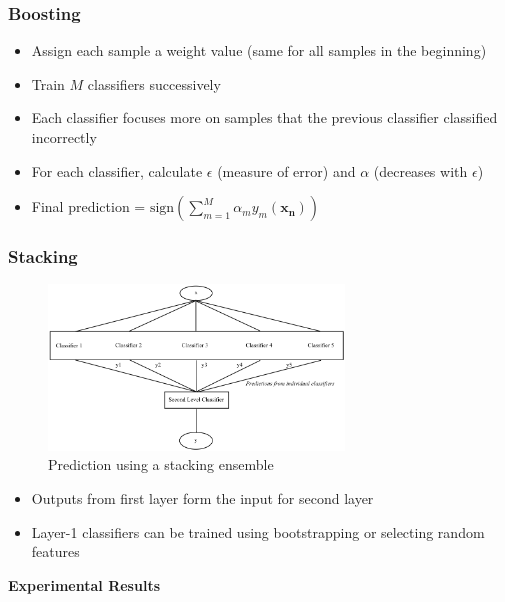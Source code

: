 \documentclass[9pt]{beamer}
\begin{document}
    \begin{frame}
        \frametitle{Boosting}
        \begin{itemize}
            \item{Assign each sample a weight value (same for all samples in the beginning)}
            \item{Train $M$ classifiers successively}
            \item{Each classifier focuses more on samples that the previous classifier classified incorrectly}
            \item{For each classifier, calculate $\epsilon$ (measure of error) and $\alpha$ (decreases with $\epsilon$)}
            \item{Final prediction = $\mathrm{sign}(\displaystyle \sum_{m = 1}^{M} \alpha_m y_m(\mathbf{x_n}))$}
        \end{itemize}
    \end{frame}
    
    \begin{frame}
        \frametitle{Stacking}
        \begin{figure}
            \centering
            \includegraphics[width=0.7\textwidth]{figures/stacking_prediction_flow.png}
            \caption{Prediction using a stacking ensemble}
        \end{figure}
        \begin{itemize}
            \item{Outputs from first layer form the input for second layer}
            \item{Layer-1 classifiers can be trained using bootstrapping or selecting random features}
        \end{itemize}
    \end{frame}
    
    \begin{frame}
        \begin{center}
            \textbf{Experimental Results}
        \end{center}
    \end{frame}
    
\end{document}
